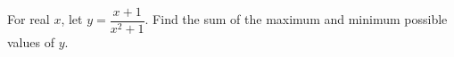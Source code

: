 For real $ x $, let $ y=\dfrac{x+1}{x^2+1}$. Find the sum of the maximum and minimum possible values of $ y $.
